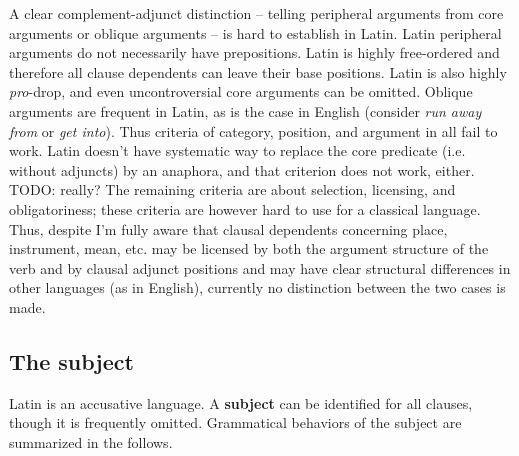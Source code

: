 \documentclass[a4paper, oneside, 12pt]{report}
\newcommand*{\citesec}[1]{\S~{#1}}
\newcommand*{\concept}[1]{\textbf{#1}}
\newcommand*{\term}[1]{\emph{#1}}
\newcommand{\form}[1]{\emph{#1}}
\begin{document}
A clear complement-adjunct distinction 
-- telling peripheral arguments from core arguments or oblique arguments --
is hard to establish in Latin.
Latin peripheral arguments do not necessarily have prepositions.
Latin is highly free-ordered and therefore all clause dependents 
can leave their base positions.
Latin is also highly \term{pro}-drop,
and even uncontroversial core arguments can be omitted.
Oblique arguments are frequent in Latin,
as is the case in English 
(consider \form{run away from} or \form{get into}).
Thus criteria of category, position, and argument in \citet[\citesec{4.1.2}]{cgel} 
all fail to work.
Latin doesn't have systematic way to replace the core predicate (i.e. without adjuncts) by an anaphora,
and that criterion does not work, either. TODO: really?
The remaining criteria are about selection, licensing, and obligatoriness;
these criteria are however hard to use for a classical language. 
Thus, despite I'm fully aware that  
clausal dependents concerning place, instrument, mean, etc. 
may be licensed by both the argument structure of the verb 
and by clausal adjunct positions 
and may have clear structural differences in other languages 
(as in English), 
currently no distinction between the two cases is made.


\subsection{The subject}

Latin is an accusative language.
A \concept{subject} can be identified for all clauses, 
though it is frequently omitted.
Grammatical behaviors of the subject are summarized in the follows.
\end{document}
